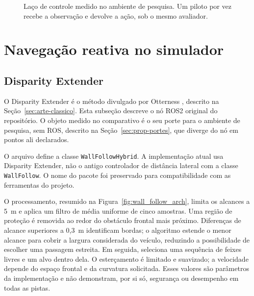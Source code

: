 \begin{figure}[htb]
\centering
{}
\caption{Laço de controle medido no ambiente de pesquisa. Um piloto por vez
recebe a observação e devolve a ação, sob o mesmo avaliador.}
\label{fig:software_arch}
\end{figure}

\section{Navegação reativa no simulador}

\subsection{Disparity Extender}

O Disparity Extender é o método divulgado por Otterness
\cite{Otterness2019Disparity}, descrito na Seção~\ref{sec:arte-classico}. Esta
subseção descreve o nó ROS2 original do repositório. O objeto medido no comparativo é o
seu porte para o ambiente de pesquisa, sem ROS, descrito na
Seção~\ref{sec:prop-portes}, que diverge do nó em pontos ali declarados.

O arquivo  define a classe
\texttt{WallFollowHybrid}. A implementação atual usa Disparity Extender, não
o antigo controlador de distância lateral com a classe \texttt{WallFollow}.
O nome do pacote foi preservado para compatibilidade com as ferramentas do projeto.

O processamento, resumido na Figura~\ref{fig:wall_follow_arch}, limita os alcances a 5~m e aplica um filtro de média uniforme
de cinco amostras. Uma região de proteção é removida ao redor do obstáculo
frontal mais próximo. Diferenças de alcance superiores a 0,3~m identificam
bordas; o algoritmo estende o menor alcance para cobrir a largura considerada
do veículo, reduzindo a possibilidade de escolher uma passagem estreita.
Em seguida, seleciona uma sequência de feixes livres e um alvo dentro dela.
O esterçamento é limitado e suavizado; a velocidade depende do espaço frontal
e da curvatura solicitada. Esses valores são parâmetros da implementação e
não demonstram, por si só, segurança ou desempenho em todas as pistas.


